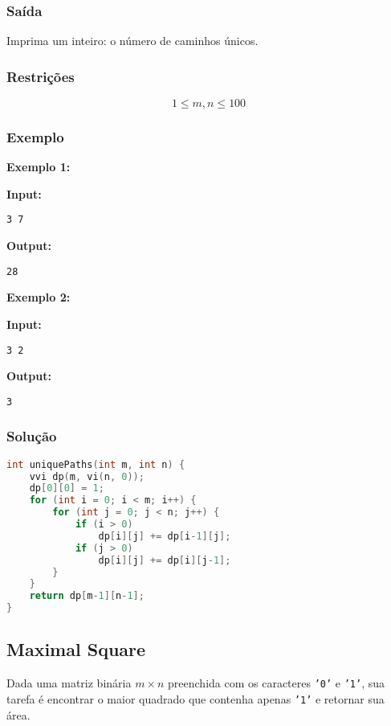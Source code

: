 \subsubsection*{Saída}
Imprima um inteiro: o número de caminhos únicos.

\subsubsection*{Restrições}
\[
1 \le m, n \le 100
\]

\subsubsection*{Exemplo}

\textbf{Exemplo 1:}

\textbf{Input:}
\begin{verbatim}
3 7
\end{verbatim}

\textbf{Output:}
\begin{verbatim}
28
\end{verbatim}

\textbf{Exemplo 2:}

\textbf{Input:}
\begin{verbatim}
3 2
\end{verbatim}

\textbf{Output:}
\begin{verbatim}
3
\end{verbatim}

\subsubsection*{Solução}
\begin{lstlisting}[language=C++]
int uniquePaths(int m, int n) {
    vvi dp(m, vi(n, 0));
    dp[0][0] = 1;
    for (int i = 0; i < m; i++) {
        for (int j = 0; j < n; j++) {
            if (i > 0)
                dp[i][j] += dp[i-1][j];
            if (j > 0)
                dp[i][j] += dp[i][j-1];
        }
    }
    return dp[m-1][n-1];
}
\end{lstlisting}
\subsection{Maximal Square}
Dada uma matriz binária \(m \times n\) preenchida com os caracteres \texttt{'0'} e \texttt{'1'}, sua tarefa é encontrar o maior quadrado que contenha apenas \texttt{'1'} e retornar sua área.

